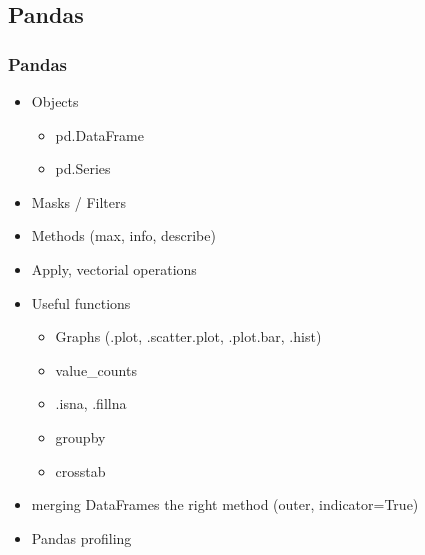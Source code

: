 \subsection{Pandas}

\begin{frame}\frametitle{Pandas}
   \begin{itemize}
      \item Objects
      \begin{itemize}
         \item pd.DataFrame
         \item pd.Series
      \end{itemize}
      \item Masks / Filters
      \item Methods (max, info, describe)
      \item Apply, vectorial operations
      \item Useful functions
      \begin{itemize}
         \item Graphs (.plot, .scatter.plot, .plot.bar, .hist)
         \item value\_counts
         \item .isna, .fillna
         \item groupby
         \item crosstab
      \end{itemize}
      \item merging DataFrames the right method (outer, indicator=True)
      \item Pandas profiling
   \end{itemize}
\end{frame}



